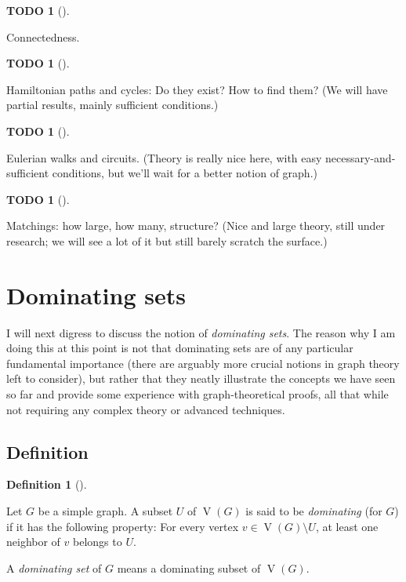 \documentclass[numbers=enddot,12pt,final,onecolumn,notitlepage]{scrartcl}%
\theoremstyle{definition}
\newtheorem{defi}[theo]{Definition}
\newenvironment{definition}[1][]
{\begin{defi}[#1]\begin{leftbar}}
{\end{leftbar}\end{defi}}
\newtheorem{quest}[theo]{TODO}
\newenvironment{todo}[1][]
{\begin{quest}[#1]\begin{leftbar}}
{\end{leftbar}\end{quest}}
\newcommand{\verts}[1]{\operatorname{V}\left( #1 \right)}
\begin{document}
\begin{todo}
Connectedness.
\end{todo}

\begin{todo}
Hamiltonian paths and cycles:
Do they exist? How to find them? (We will have partial results, mainly sufficient conditions.)
\end{todo}

\begin{todo}
Eulerian walks and circuits.
(Theory is really nice here, with easy necessary-and-sufficient conditions, but we'll wait for a better notion of graph.)
\end{todo}

\begin{todo}
Matchings:
how large, how many, structure? (Nice and large theory, still under research; we will see a lot of it but still barely scratch the surface.)
\end{todo}

\section{\label{sect.dominating}Dominating sets}

I will next digress to discuss the notion of \textit{dominating sets}.
The reason why I am doing this at this point is not that dominating
sets are of any particular fundamental importance (there are arguably
more crucial notions in graph theory left to consider), but rather
that they neatly illustrate the concepts we have seen so far and
provide some experience with graph-theoretical proofs, all that while
not requiring any complex theory or advanced techniques.

\subsection{\label{subsect.dominating.defs}Definition}

\begin{definition} \label{def.dominating}
Let $G$ be a simple graph. A subset $U$ of $\verts{G}$ is said to be
\textit{dominating} (for $G$) if it has the following property: For
every vertex $v \in \verts{G} \setminus U$, at least one neighbor of
$v$ belongs to $U$.

A \textit{dominating set} of $G$ means a dominating subset of
$\verts{G}$.
\end{definition}
\end{document}
